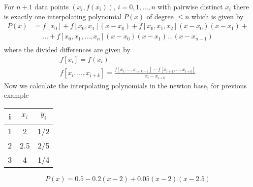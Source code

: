 For $n+1$ data points $(x_i, f(x_i))$, $i = 0,1,\ldots, n$ with pairwise distinct $x_i$ there is exactly one interpolating polynomial $P(x)$
of degree $\leq n$ which is given by
\begin{align*}
    P(x) &= f[x_0]+f[x_0, x_1] (x-x_0) + f[x_0, x_1, x_2] (x-x_0)(x-x_1)+\\
    &\phantom{=}\ldots + f[x_0, x_1, \ldots, x_n] (x-x_0)(x-x_1)\ldots (x-x_{n-1})\\
\end{align*}
where the divided differences are given by
\begin{align*}
    f[x_i] = f(x_i)\\
    f[x_i, \ldots, x_{i+k}] = \frac{f[x_i, \ldots, x_{i+k-1}]-f[x_{i+1}, \ldots, x_{i+k}]}{x_i - x_{i+k}}
\end{align*}
Now we calculate the interpolating polynomials in the newton base, for previous example


\begin{center}
    \begin{tabular}{ccc}
        \toprule
        i & $x_i$ & $y_i$ \\
        \midrule
        1 & 2     & 1/2   \\
        2 & 2.5   & 2/5   \\
        3 & 4     & 1/4   \\
        \bottomrule
    \end{tabular}
\end{center}


\begin{center}
\end{center}
\begin{equation*}
    P(x)= 0.5-0.2(x-2)+0.05(x-2)(x-2.5)
\end{equation*}

